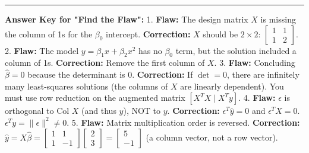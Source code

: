 \documentclass[11pt, letterpaper]{article}
\theoremstyle{definition}
\theoremstyle{remark}
\begin{document}
\hrule
\vspace{0.5cm}
\textbf{Answer Key for "Find the Flaw":}
1. \textbf{Flaw:} The design matrix $X$ is missing the column of 1s for the $\beta_0$ intercept. \textbf{Correction:} $X$ should be $2 \times 2$: $\begin{bmatrix} 1 & 1 \\ 1 & 2 \end{bmatrix}$.
2. \textbf{Flaw:} The model $y = \beta_1 x + \beta_2 x^2$ has no $\beta_0$ term, but the solution included a column of 1s. \textbf{Correction:} Remove the first column of $X$.
3. \textbf{Flaw:} Concluding $\hat{\beta} = 0$ because the determinant is 0. \textbf{Correction:} If $\det = 0$, there are infinitely many least-squares solutions (the columns of $X$ are linearly dependent). You must use row reduction on the augmented matrix $[X^T X \mid X^T y]$.
4. \textbf{Flaw:} $\epsilon$ is orthogonal to $\text{Col } X$ (and thus $\hat{y}$), NOT to $y$. \textbf{Correction:} $\epsilon^T \hat{y} = 0$ and $\epsilon^T X = 0$. $\epsilon^T y = \|\epsilon\|^2 \neq 0$.
5. \textbf{Flaw:} Matrix multiplication order is reversed. \textbf{Correction:} $\hat{y} = X\hat{\beta} = \begin{bmatrix} 1 & 1 \\ 1 & -1 \end{bmatrix} \begin{bmatrix} 2 \\ 3 \end{bmatrix} = \begin{bmatrix} 5 \\ -1 \end{bmatrix}$ (a column vector, not a row vector).
\end{document}
